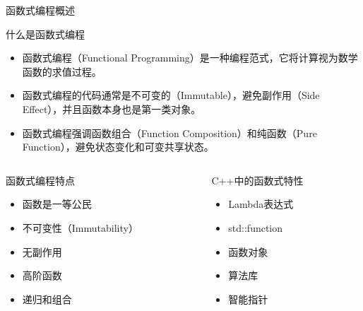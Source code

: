 \documentclass[UTF8,aspectratio=169]{beamer}
\begin{document}
\begin{frame}{函数式编程概述}
    \begin{ytublock}{什么是函数式编程}
        \begin{itemize}
            \item 函数式编程（Functional Programming）是一种编程范式，它将计算视为数学函数的求值过程。
            \item 函数式编程的代码通常是不可变的（Immutable），避免副作用（Side Effect），并且函数本身也是第一类对象。
            \item 函数式编程强调函数组合（Function Composition）和纯函数（Pure Function），避免状态变化和可变共享状态。
        \end{itemize}
    \end{ytublock}
    \begin{columns}
        \begin{column}{0.48\textwidth}
            \begin{ytublock}{函数式编程特点}
                \begin{itemize}
                    \item 函数是一等公民
                    \item 不可变性（Immutability）
                    \item 无副作用
                    \item 高阶函数
                    \item 递归和组合
                \end{itemize}
            \end{ytublock}
        \end{column}
        \begin{column}{0.48\textwidth}
            \begin{ytublock}{C++中的函数式特性}
                \begin{itemize}
                    \item Lambda表达式
                    \item std::function
                    \item 函数对象
                    \item 算法库
                    \item 智能指针
                \end{itemize}
            \end{ytublock}
        \end{column}
    \end{columns}
\end{frame}
\end{document}
